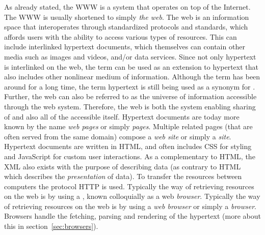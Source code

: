 \documentclass[a4paper,11pt]{kth-mag}
\begin{document}
      As already stated, the \gls{WWW} is a system that operates on top of the Internet.
      The \gls{WWW} is usually shortened to simply \emph{the \gls{web}}.
      The \gls{web} is an information space that interoperates through standardized protocols and standards, which affords users with the ability to access various types of resources.
      This can include interlinked \gls{hypertext} \glspl{document}, which themselves can contain other media such as images and videos, and/or data services.
      Since not only \gls{hypertext} is interlinked on the \gls{web}, the term \emph{} can be used as an extension to \gls{hypertext} that also includes other nonlinear medium of information.
      Although the term  has been around for a long time, the term \gls{hypertext} is still being used as a synonym for .
      Further, the \gls{web} can also be referred to as the universe of information accessible through the \gls{web} system.
      Therefore, the \gls{web} is both the system enabling sharing of  and also all of the accessible  itself.
      Hypertext \glspl{document} are today more known by the name \emph{\gls{web} pages} or simply \emph{pages}.
      Multiple related pages (that are often served from the same domain) compose a \emph{web site} or simply a \emph{site}.
      Hypertext \glspl{document} are written in \gls{HTML}, and often includes \gls{CSS} for styling and \gls{JavaScript} for custom user interactions.
      As a complementary to \gls{HTML}, the \gls{XML} also exists with the purpose of describing data (as contrary to \gls{HTML} which describes the \emph{presentation} of data).
      To transfer the resources between computers the protocol \gls{HTTP} is used.
      Typically the way of retrieving resources on the web is by using a \emph{}, known colloquially as a \gls{web} \emph{\gls{browser}}.
      Typically the way of retrieving resources on the \gls{web} is by using a \emph{\gls{web} \gls{browser}} or simply a \emph{\gls{browser}}.
      Browsers handle the fetching, parsing and rendering of the \gls{hypertext} (more about this in section~\ref{sec:browsers}).
      
\end{document}
